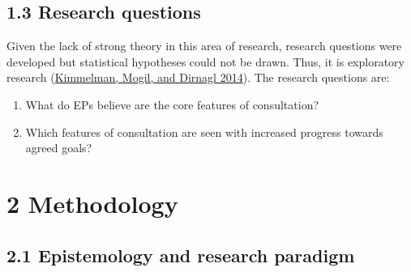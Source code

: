 \documentclass[
]{article}
\begin{document}
\hypertarget{research-questions}{%
\subsection{1.3 Research questions}\label{research-questions}}

Given the lack of strong theory in this area of research, research
questions were developed but statistical hypotheses could not be drawn.
Thus, it is exploratory research
(\protect\hyperlink{ref-kimmelmanDistinguishingExploratoryConfirmatory2014}{Kimmelman,
Mogil, and Dirnagl 2014}). The research questions are:

\begin{enumerate}
\def\labelenumi{\arabic{enumi}.}
\item
  What do EPs believe are the core features of consultation?
\item
  Which features of consultation are seen with increased progress
  towards agreed goals?
\end{enumerate}

\hypertarget{methodology}{%
\section{2 Methodology}\label{methodology}}

\hypertarget{epistemology-and-research-paradigm}{%
\subsection{2.1 Epistemology and research
paradigm}\label{epistemology-and-research-paradigm}}
\end{document}
